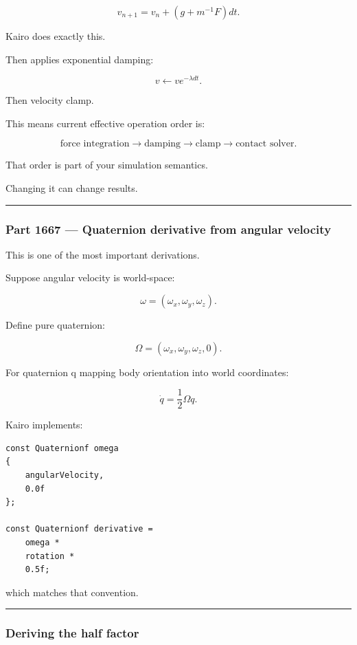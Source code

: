 \[
\boxed{
v_{n+1}
=
v_n+
\left(
g+m^{-1}F
\right)dt.
}
\]

Kairo does exactly this.

Then applies exponential damping:

\[
v
\leftarrow
ve^{-\lambda dt}.
\]

Then velocity clamp.

This means current effective operation order is:

\[
\text{force integration}
\rightarrow
\text{damping}
\rightarrow
\text{clamp}
\rightarrow
\text{contact solver}.
\]

That order is part of your simulation semantics.

Changing it can change results.

\begin{center}\rule{0.5\linewidth}{0.5pt}\end{center}

\subsubsection{Part 1667 --- Quaternion derivative from angular velocity}\label{part-1667-quaternion-derivative-from-angular-velocity}

This is one of the most important derivations.

Suppose angular velocity is world-space:

\[
\omega=
(\omega_x,\omega_y,\omega_z).
\]

Define pure quaternion:

\[
\Omega
=
(\omega_x,\omega_y,\omega_z,0).
\]

For quaternion q mapping body orientation into world coordinates:

\[
\boxed{
\dot q
=
\frac12
\Omega q.
}
\]

Kairo implements:

\begin{verbatim}
const Quaternionf omega
{
    angularVelocity,
    0.0f
};

const Quaternionf derivative =
    omega *
    rotation *
    0.5f;
\end{verbatim}

which matches that convention.

\begin{center}\rule{0.5\linewidth}{0.5pt}\end{center}

\subsubsection{Deriving the half factor}\label{deriving-the-half-factor}

